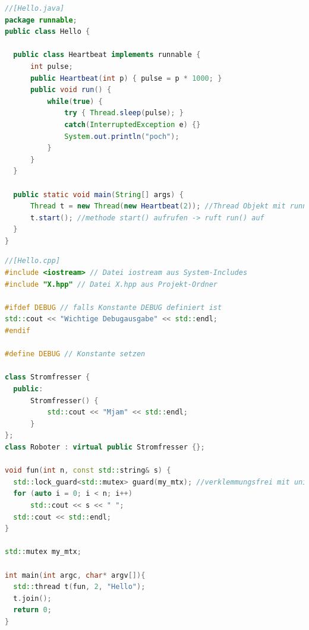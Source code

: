 \documentclass[10pt]{article}
\begin{document}
  \begin{lstlisting}[language=java]
//[Hello.java]
package runnable;
public class Hello {

  public class Heartbeat implements runnable {
      int pulse;
      public Heartbeat(int p) { pulse = p * 1000; }
      public void run() {
          while(true) {
              try { Thread.sleep(pulse); }
              catch(InterruptedException e) {}
              System.out.println("poch");
          }
      }
  }

  public static void main(String[] args) {
      Thread t = new Thread(new Heartbeat(2)); //Thread Objekt mit runnable erzeugen
      t.start(); //methode start() aufrufen -> ruft run() auf
  }
}
\end{lstlisting}
  \hfill
  \begin{lstlisting}[language=C++]
//[Hello.cpp]
#include <iostream> // Datei iostream aus System-Includes
#include "X.hpp" // Datei X.hpp aus Projekt-Ordner

#ifdef DEBUG // falls Konstante DEBUG definiert ist
std::cout << "Wichtige Debugausgabe" << std::endl;
#endif

#define DEBUG // Konstante setzen

class Stromfresser {
  public:
      Stromfresser() {
          std::cout << "Mjam" << std::endl;
      }
};
class Roboter : virtual public Stromfresser {};

void fun(int n, const std::string& s) {
  std::lock_guard<std::mutex> guard(my_mtx); //verklemmungsfrei mit unique_lock<std::mutex>
  for (auto i = 0; i < n; i++)
      std::cout << s << " ";
  std::cout << std::endl;
}

std::mutex my_mtx;

int main(int argc, char* argv[]){
  std::thread t(fun, 2, "Hello");
  t.join();
  return 0;
}
\end{lstlisting}
  \hfill
\end{document}
